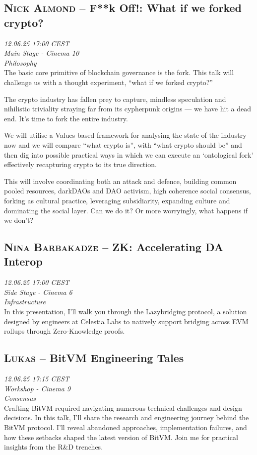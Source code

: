 \clearpage
\subsection {\textsc{Nick Almond}  -- F**k Off!: What if we forked crypto?} \noindent \textit {12.06.25 17:00 CEST\\ Main Stage - Cinema 10\\ Philosophy}\\[1em] The basic core primitive of blockchain governance is the fork. This talk will challenge us with a thought experiment, “what if we forked crypto?”

The crypto industry has fallen prey to capture, mindless speculation and nihilistic triviality straying far from its cypherpunk origins — we have hit a dead end. It’s time to fork the entire industry.

We will utilise a Values based framework for analysing the state of the industry now and we will compare “what crypto is”, with “what crypto should be” and then dig into possible practical ways in which we can execute an ‘ontological fork’ effectively recapturing crypto to its true direction.

This will involve coordinating both an attack and defence, building common pooled resources, darkDAOs and DAO activism, high coherence social consensus, forking as cultural practice, leveraging subsidiarity, expanding culture and dominating the social layer. Can we do it? Or more worryingly, what happens if we don’t?

\clearpage
\subsection {\textsc{Nina Barbakadze}  -- ZK: Accelerating DA Interop} \noindent \textit {12.06.25 17:00 CEST\\ Side Stage - Cinema 6\\ Infrastructure}\\[1em] In this presentation, I’ll walk you through the Lazybridging protocol, a solution designed by engineers at Celestia Labs to natively support bridging across EVM rollups through Zero-Knowledge proofs.

\clearpage
\subsection {\textsc{Lukas}  -- BitVM Engineering Tales} \noindent \textit {12.06.25 17:15 CEST\\ Workshop - Cinema 9\\ Consensus}\\[1em] Crafting BitVM required navigating numerous technical challenges and design decisions. In this talk, I'll share the research and engineering journey behind the BitVM protocol. I'll reveal abandoned approaches, implementation failures, and how these setbacks shaped the latest version of BitVM. Join me for practical insights from the R\&D trenches.

